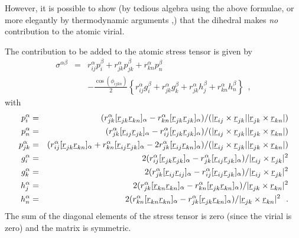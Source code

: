 However, it is possible to show (by tedious algebra using the
above formulae, or more elegantly by thermodynamic arguments
\cite{smith-93c},) that the dihedral makes {\em no} contribution
to the atomic virial.

The contribution to be added to the atomic stress tensor is given by
\begin{eqnarray}
\sigma^{\alpha \beta}&=&r_{ij}^{\alpha}p_{i}^{\beta}+
r_{jk}^{\alpha}p_{jk}^{\beta}+r_{kn}^{\alpha}p_{n}^{\beta} \\ & &
-\frac{\cos(\phi_{ijkn})}{2}\left \{r_{ij}^{\alpha}g_{i}^{\beta}+
r_{jk}^{\alpha}g_{k}^{\beta}+r_{jk}^{\alpha}h_{j}^{\beta}+r_{kn}^{\alpha}h_{n}^{\beta}\right\}
~~,\nonumber
\end{eqnarray}
with
\begin{eqnarray}
p_{i}^{\alpha}&=&(r_{jk}^{\alpha}[\mbox{$\underline{r}$}_{jk}\mbox{$\underline{r}$}_{kn}]_{\alpha}-
r_{kn}^{\alpha}[\mbox{$\underline{r}$}_{jk}\mbox{$\underline{r}$}_{jk}]_{\alpha})/
(|\mbox{$\underline{r}$}_{ij}\times\mbox{$\underline{r}$}_{jk}||\mbox{$\underline{r}$}_{jk}\times\mbox{$\underline{r}$}_{kn}|) \nonumber \\
p_{n}^{\alpha}&=&(r_{jk}^{\alpha}[\mbox{$\underline{r}$}_{ij}\mbox{$\underline{r}$}_{jk}]_{\alpha}-
r_{ij}^{\alpha}[\mbox{$\underline{r}$}_{jk}\mbox{$\underline{r}$}_{jk}]_{\alpha})/
(|\mbox{$\underline{r}$}_{ij}\times\mbox{$\underline{r}$}_{jk}||\mbox{$\underline{r}$}_{jk}\times\mbox{$\underline{r}$}_{kn}|) \nonumber \\
p_{jk}^{\alpha}&=&(r_{ij}^{\alpha}[\mbox{$\underline{r}$}_{jk}\mbox{$\underline{r}$}_{kn}]_{\alpha}+
r_{kn}^{\alpha}[\mbox{$\underline{r}$}_{ij}\mbox{$\underline{r}$}_{jk}]_{\alpha}-
2r_{jk}^{\alpha}[\mbox{$\underline{r}$}_{ij}\mbox{$\underline{r}$}_{kn}]_{\alpha})/
(|\mbox{$\underline{r}$}_{ij}\times\mbox{$\underline{r}$}_{jk}||\mbox{$\underline{r}$}_{jk}\times\mbox{$\underline{r}$}_{kn}|) \nonumber \\
g_{i}^{\alpha}&=&2(r_{ij}^{\alpha}[\mbox{$\underline{r}$}_{jk}\mbox{$\underline{r}$}_{jk}]_{\alpha}-
r_{jk}^{\alpha}[\mbox{$\underline{r}$}_{ij}\mbox{$\underline{r}$}_{jk}]_{\alpha})/
|\mbox{$\underline{r}$}_{ij}\times\mbox{$\underline{r}$}_{jk}|^{2} \\
g_{k}^{\alpha}&=&2(r_{jk}^{\alpha}[\mbox{$\underline{r}$}_{ij}\mbox{$\underline{r}$}_{ij}]_{\alpha}-
r_{ij}^{\alpha}[\mbox{$\underline{r}$}_{ij}\mbox{$\underline{r}$}_{jk}]_{\alpha})/
|\mbox{$\underline{r}$}_{ij}\times\mbox{$\underline{r}$}_{jk}|^{2} \nonumber \\
h_{j}^{\alpha}&=&2(r_{jk}^{\alpha}[\mbox{$\underline{r}$}_{kn}\mbox{$\underline{r}$}_{kn}]_{\alpha}-
r_{kn}^{\alpha}[\mbox{$\underline{r}$}_{jk}\mbox{$\underline{r}$}_{kn}]_{\alpha})/
|\mbox{$\underline{r}$}_{jk}\times\mbox{$\underline{r}$}_{kn}|^{2} \nonumber \\
h_{n}^{\alpha}&=&2(r_{kn}^{\alpha}[\mbox{$\underline{r}$}_{kn}\mbox{$\underline{r}$}_{kn}]_{\alpha}-
r_{jk}^{\alpha}[\mbox{$\underline{r}$}_{jk}\mbox{$\underline{r}$}_{kn}]_{\alpha})/
|\mbox{$\underline{r}$}_{jk}\times\mbox{$\underline{r}$}_{kn}|^{2}~~. \nonumber
\end{eqnarray}
The sum of the diagonal elements of the stress tensor is zero (since the virial is zero) and the matrix is
symmetric.

